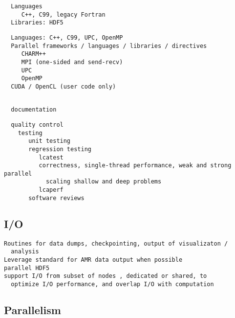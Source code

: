\documentclass[14pt,letter]{article}
\begin{document}
\begin{verbatim}
  Languages
     C++, C99, legacy Fortran
  Libraries: HDF5
\end{verbatim}

\begin{verbatim}
  Languages: C++, C99, UPC, OpenMP
  Parallel frameworks / languages / libraries / directives
     CHARM++
     MPI (one-sided and send-recv)
     UPC
     OpenMP
  CUDA / OpenCL (user code only)
\end{verbatim}

\begin{verbatim}

  documentation

\end{verbatim}

\begin{verbatim}
  quality control
    testing 
       unit testing
       regression testing
          lcatest
          correctness, single-thread performance, weak and strong parallel 
            scaling shallow and deep problems
          lcaperf
       software reviews
\end{verbatim}

\subsection{I/O} \label{ss:io}

\begin{verbatim}
Routines for data dumps, checkpointing, output of visualizaton /
  analysis
Leverage standard for AMR data output when possible
parallel HDF5
support I/O from subset of nodes , dedicated or shared, to
  optimize I/O performance, and overlap I/O with computation
\end{verbatim}

\subsection{Parallelism} \label{ss:parallelism}
\end{document}
